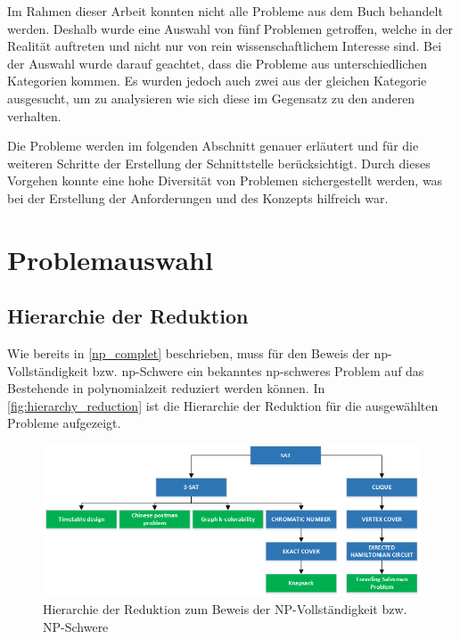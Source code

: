 Im Rahmen dieser Arbeit konnten nicht alle Probleme aus dem Buch behandelt werden. Deshalb wurde eine Auswahl von fünf Problemen getroffen, welche in der Realität auftreten und nicht 
nur von rein wissenschaftlichem Interesse sind. Bei der Auswahl wurde darauf geachtet, dass die Probleme aus unterschiedlichen Kategorien kommen. Es wurden jedoch auch zwei aus der 
gleichen Kategorie ausgesucht, um zu analysieren wie sich diese im Gegensatz zu den anderen verhalten. 

Die Probleme werden im folgenden Abschnitt genauer erläutert und für die weiteren Schritte der Erstellung der Schnittstelle berücksichtigt. Durch dieses Vorgehen konnte eine 
hohe Diversität von Problemen sichergestellt werden, was bei der Erstellung der Anforderungen und des Konzepts hilfreich war.

\section{Problemauswahl}\label{problem_selection}

\subsection{Hierarchie der Reduktion}\label{hierarchy_reduction}
Wie bereits in \ref{np_complet} beschrieben, muss für den Beweis der \gls{np}-Vollständigkeit bzw. \gls{np}-Schwere ein bekanntes \gls{np}-schweres Problem auf das Bestehende in 
\gls{polynomialzeit} reduziert werden können. In \autoref{fig:hierarchy_reduction} ist die Hierarchie der Reduktion für die ausgewählten Probleme aufgezeigt.

\begin{figure}[h]
\centering 
\includegraphics[scale=0.75]{images/visio/problem_hierarchy.png}
\caption[Hierarchie der Reduktion zum Beweis der NP-Vollständigkeit bzw. NP-Schwere]{Hierarchie der Reduktion zum Beweis der NP-Vollständigkeit bzw. NP-Schwere }
\label{fig:hierarchy_reduction}
\end{figure}

